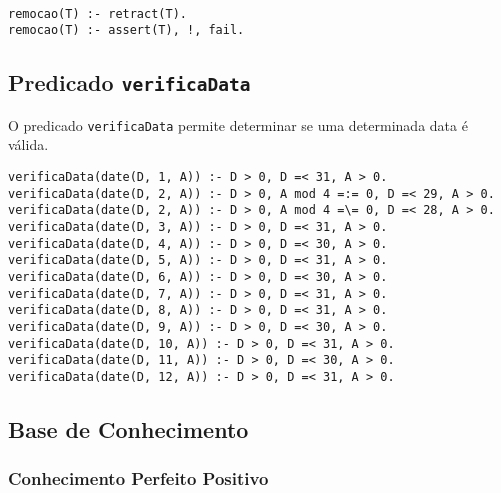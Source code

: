 \

\begin{lstlisting}[caption={Extensão do meta-predicado \texttt{remocao}}]
% Extensao do meta-predicado remocao: T -> {V, F}
remocao(T) :- retract(T).
remocao(T) :- assert(T), !, fail.
\end{lstlisting}


\subsection*{Predicado \texttt{verificaData}}

O predicado \texttt{verificaData} permite determinar se uma determinada data é válida.

\begin{lstlisting}[caption={Extensão do predicado \texttt{verificaData}}]
% Extensao do predicado verificaData: date(D, M, A) -> {V, F}
verificaData(date(D, 1, A)) :- D > 0, D =< 31, A > 0.
verificaData(date(D, 2, A)) :- D > 0, A mod 4 =:= 0, D =< 29, A > 0. 
verificaData(date(D, 2, A)) :- D > 0, A mod 4 =\= 0, D =< 28, A > 0.
verificaData(date(D, 3, A)) :- D > 0, D =< 31, A > 0.
verificaData(date(D, 4, A)) :- D > 0, D =< 30, A > 0.
verificaData(date(D, 5, A)) :- D > 0, D =< 31, A > 0.
verificaData(date(D, 6, A)) :- D > 0, D =< 30, A > 0.
verificaData(date(D, 7, A)) :- D > 0, D =< 31, A > 0.
verificaData(date(D, 8, A)) :- D > 0, D =< 31, A > 0.
verificaData(date(D, 9, A)) :- D > 0, D =< 30, A > 0.
verificaData(date(D, 10, A)) :- D > 0, D =< 31, A > 0.
verificaData(date(D, 11, A)) :- D > 0, D =< 30, A > 0.
verificaData(date(D, 12, A)) :- D > 0, D =< 31, A > 0.
\end{lstlisting}

\pagebreak

\subsection{Base de Conhecimento}

\subsubsection{Conhecimento Perfeito Positivo}
\label{sec:perfeito_positivo}

\


